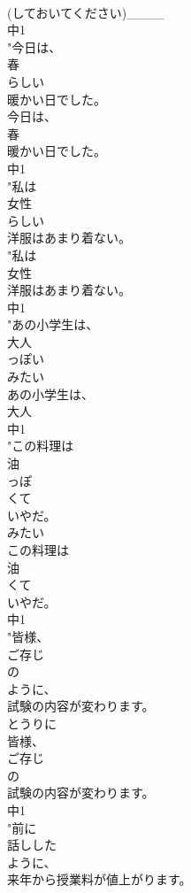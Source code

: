 \documentclass[8pt]{extreport}
\begin{document}
\begin{CJK}{UTF8}{min}
\\	(しておいてください)____
\\	中1
\\	"今日は、
\\	春
\\	らしい
\\	暖かい日でした。
\\	今日は、
\\	春
\\	暖かい日でした。
\\	中1
\\	"私は
\\	女性
\\	らしい
\\	洋服はあまり着ない。
\\	"私は
\\	女性
\\	洋服はあまり着ない。
\\	中1
\\	"あの小学生は、
\\	大人
\\	っぽい
\\	みたい　
\\	あの小学生は、
\\	大人
\\	中1
\\	"この料理は
\\	油
\\	っぽ
\\	くて
\\	いやだ。
\\	みたい　
\\	この料理は
\\	油
\\	くて
\\	いやだ。
\\	中1
\\	"皆様、
\\	ご存じ
\\	の
\\	ように、
\\	試験の内容が変わります。
\\	とうりに 
\\	皆様、
\\	ご存じ
\\	の
\\	試験の内容が変わります。
\\	中1
\\	"前に
\\	話しした
\\	ように、
\\	来年から授業料が値上がります。

\end{CJK}
\end{document}
